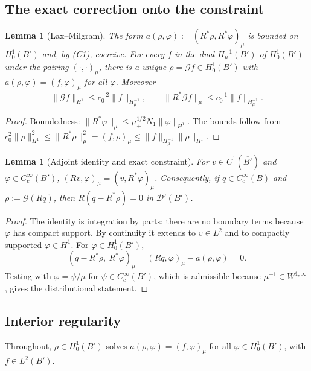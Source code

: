 \documentclass[11pt]{article}
\theoremstyle{plain}
\newtheorem{lemma}[theorem]{Lemma}
\theoremstyle{definition}
\theoremstyle{remark}
\begin{document}
\subsection{The exact correction onto the constraint}\label{app:r1-projection}

\begin{lemma}[Lax--Milgram]\label{lem:lm}
The form $a(\rho,\varphi) := (R^*\rho,R^*\varphi)_\mu$ is bounded on $H^1_0(B')$ and, by (C1), coercive. For every $f$ in the dual $H^{-1}_\mu(B')$ of $H^1_0(B')$ under the pairing $(\cdot,\cdot)_\mu$, there is a unique $\rho = \mathcal{G}f \in H^1_0(B')$ with $a(\rho,\varphi) = (f,\varphi)_\mu$ for all $\varphi$. Moreover
\[
  \|\mathcal Gf\|_{H^1} \le c_0^{-2}\|f\|_{H^{-1}_\mu},\qquad \|R^*\mathcal Gf\|_\mu \le c_0^{-1}\|f\|_{H^{-1}_\mu}.
\]
\end{lemma}

\begin{proof}
Boundedness: $\|R^*\varphi\|_\mu \le \mu_+^{1/2}N_1\|\varphi\|_{H^1}$. The bounds follow from $c_0^2\|\rho\|_{H^1}^2 \le \|R^*\rho\|_\mu^2 = (f,\rho)_\mu \le \|f\|_{H^{-1}_\mu}\|\rho\|_{H^1}$.
\end{proof}

\begin{lemma}[Adjoint identity and exact constraint]\label{lem:adjoint}
For $v \in C^1(\overline{B'})$ and $\varphi \in C^\infty_c(B')$, $(Rv,\varphi)_\mu = (v,R^*\varphi)_\mu$. Consequently, if $q \in C^\infty_c(B)$ and $\rho := \mathcal G(Rq)$, then $R(q - R^*\rho) = 0$ in $\mathcal D'(B')$.
\end{lemma}

\begin{proof}
The identity is integration by parts; there are no boundary terms because $\varphi$ has compact support. By continuity it extends to $v \in L^2$ and to compactly supported $\varphi \in H^1$. For $\varphi \in H^1_0(B')$,
\[
  (q - R^*\rho,\ R^*\varphi)_\mu = (Rq,\varphi)_\mu - a(\rho,\varphi) = 0 .
\]
Testing with $\varphi = \psi/\mu$ for $\psi \in C^\infty_c(B')$, which is admissible because $\mu^{-1} \in W^{1,\infty}$, gives the distributional statement.
\end{proof}

\subsection{Interior regularity}\label{app:r1-regularity}

Throughout, $\rho \in H^1_0(B')$ solves $a(\rho,\varphi) = (f,\varphi)_\mu$ for all $\varphi \in H^1_0(B')$, with $f \in L^2(B')$.
\end{document}
